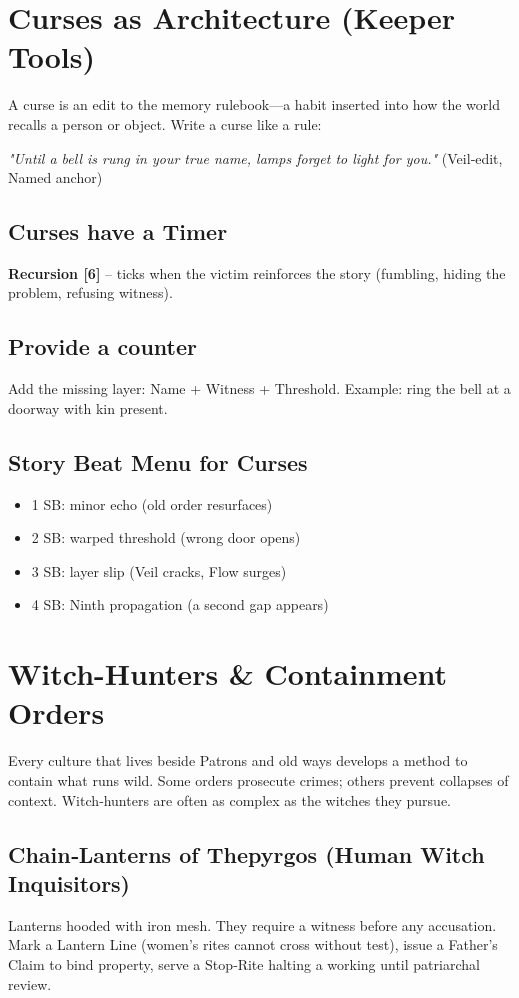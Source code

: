 \documentclass[10pt,a5paper]{book}
\begin{document}
\section{Curses as Architecture (Keeper Tools)}

A curse is an edit to the memory rulebook---a habit inserted into how the world recalls a person or object. Write a curse like a rule:

\emph{"Until a bell is rung in your true name, lamps forget to light for you."} (Veil‑edit, Named anchor)

\subsection{Curses have a Timer }
\textbf{Recursion [6]} -- ticks when the victim reinforces the story (fumbling, hiding the problem, refusing witness).

\subsection{Provide a counter}
Add the missing layer: Name + Witness + Threshold. Example: ring the bell at a doorway with kin present.

\subsection{Story Beat Menu for Curses}
\begin{itemize}
    \item 1 SB: minor echo (old order resurfaces)
    \item 2 SB: warped threshold (wrong door opens)
    \item 3 SB: layer slip (Veil cracks, Flow surges)
    \item 4 SB: Ninth propagation (a second gap appears)
\end{itemize}

\section{Witch-Hunters \& Containment Orders}

Every culture that lives beside Patrons and old ways develops a method to contain what runs wild. Some orders prosecute crimes; others prevent collapses of context. Witch‑hunters are often as complex as the witches they pursue.

\subsection{Chain‑Lanterns of Thepyrgos (Human Witch Inquisitors)}
Lanterns hooded with iron mesh. They require a witness before any accusation. Mark a Lantern Line (women's rites cannot cross without test), issue a Father's Claim to bind property, serve a Stop‑Rite halting a working until patriarchal review.
\end{document}
